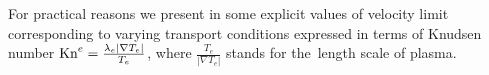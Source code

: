 For practical reasons we present in  
some explicit values of velocity limit corresponding to varying transport 
conditions expressed in terms of Knudsen number 
$\text{Kn}^e = \frac{\lambda_e |\nabla T_e|}{T_e}$, 
where $\frac{T_e}{|\nabla T_e|}$ stands for the~length scale of plasma.
